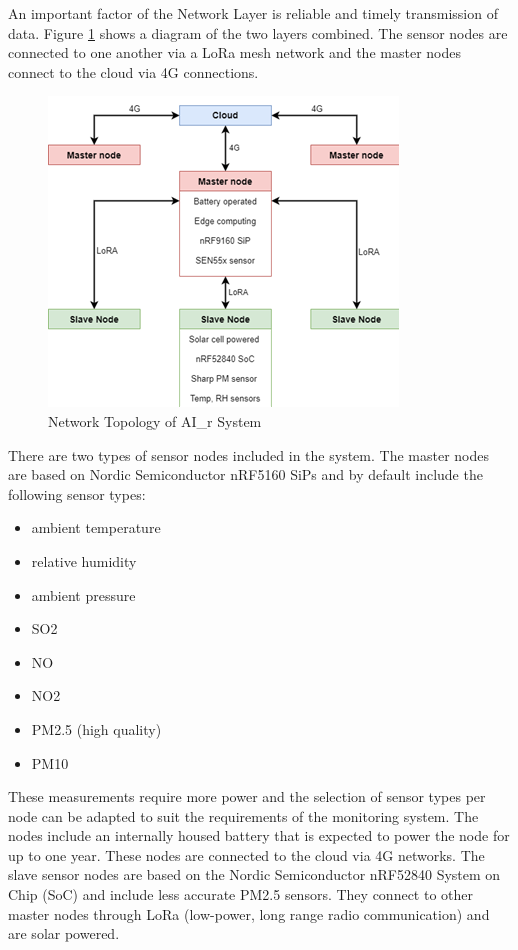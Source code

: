 \documentclass[a4paper,twoside,12pt]{report}
\begin{document}
An important factor of the Network Layer is reliable and timely transmission of data.
\newline \newline
Figure \ref{fig:NetworkTopology} shows a diagram of the two layers combined. The sensor nodes are connected to one another via a LoRa mesh network and the master nodes connect to the cloud via 4G connections.

\begin{figure}[ht]
	\centering
	\includegraphics[width=0.4\linewidth]{images/Network_topology_of_AI_r_system_cropped.png}
	\caption{Network Topology of AI\_r System}
	\label{fig:NetworkTopology}
\end{figure}

There are two types of sensor nodes included in the system. The master nodes are based on Nordic Semiconductor nRF5160 SiPs and by default include the following sensor types:
\begin{itemize}
    \item ambient temperature
    \item relative humidity
    \item ambient pressure
    \item SO2
    \item NO
    \item NO2
    \item PM2.5 (high quality)
    \item PM10
\end{itemize}
These measurements require more power and the selection of sensor types per node can be adapted to suit the requirements of the monitoring system. The nodes include an internally housed battery that is expected to power the node for up to one year. These nodes are connected to the cloud via 4G networks.
\newline
The slave sensor nodes are based on the Nordic Semiconductor nRF52840 System on Chip (SoC) and include less accurate PM2.5 sensors. They connect to other master nodes through LoRa (low-power, long range radio communication) and are solar powered.
\newline 
\end{document}
